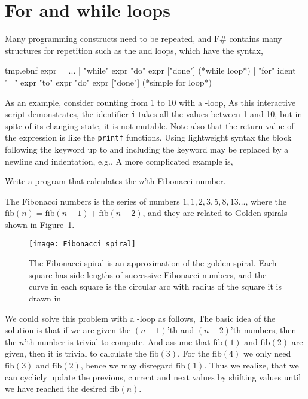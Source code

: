 \section{For and while loops}
Many programming constructs need to be repeated, and F\# contains many structures for repetition such as the  and  loops, which have the syntax,
%
\begin{verbatimwrite}{tmp.ebnf}
expr = ... 
  | "while" expr "do" expr ["done"] (*while loop*)
  | "for" ident "=" expr "to" expr "do" expr ["done"] (*simple for loop*)
\end{verbatimwrite}
%
As an example, consider counting from 1 to 10 with a -loop,
%
%
As this interactive script demonstrates, the identifier \lstinline!i! takes all the values between 1 and 10, but in spite of its changing state, it is not mutable. Note also that the return value of the  expression is \lexeme{()} like the \lstinline!printf! functions. 
Using lightweight syntax the block following the  keyword up to and including the  keyword may be replaced by a newline and indentation, e.g.,
%
%
A more complicated example is,
\begin{problem}
  Write a program that calculates the $n$'th Fibonacci number.
\end{problem}
The Fibonacci numbers is the series of numbers $1,1,2,3,5,8,13\dots$, where the $\text{fib}(n) = \text{fib}(n-1)+\text{fib}(n-2)$, and they are related to Golden spirals shown in Figure~\ref{fig:goldenSpiral}.
\begin{figure}
  \centering
  \texttt{[image: Fibonacci\_spiral]}
  \caption{The Fibonacci spiral is an approximation of the golden spiral. Each square has side lengths of successive Fibonacci numbers, and the curve in each square is the circular arc with radius of the square it is drawn in}
  \label{fig:goldenSpiral}
\end{figure}
We could solve this problem with a -loop as follows,
%
%
The basic idea of the solution is that if we are given the $(n-1)$'th and $(n-2)$'th numbers, then the $n$'th number is trivial to compute. And assume that $\text{fib}(1)$ and $\text{fib}(2)$ are given, then it is trivial to calculate the $\text{fib}(3)$. For the $\text{fib}(4)$ we only need $\text{fib}(3)$ and $\text{fib}(2)$, hence we may disregard $\text{fib}(1)$. Thus we realize, that we can cyclicly update the previous, current and next values by shifting values until we have reached the desired $\text{fib}(n)$.

